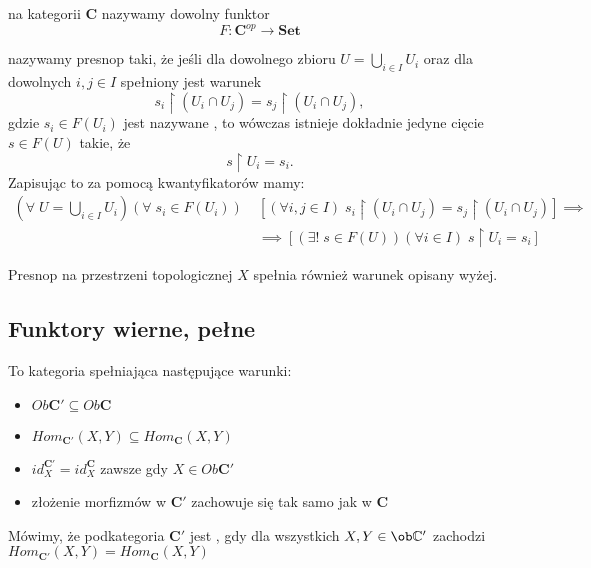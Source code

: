 \begin{definition}
   na kategorii $\mathbf{C}$ nazywamy dowolny funktor
  $$F:\mathbf{C}^{op}\to\mathbf{Set}$$

   nazywamy presnop taki, że jeśli dla dowolnego zbioru $U=\bigcup_{i\in I}U_i$ oraz dla dowolnych $i,j\in I$ spełniony jest warunek
  $$s_i\restriction(U_i\cap U_j)=s_j\restriction(U_i\cap U_j),$$
  gdzie $s_i\in F(U_i)$ jest nazywane , to wówczas istnieje dokładnie jedyne cięcie $s\in F(U)$ takie, że
  $$s\restriction U_i=s_i.$$
  Zapisując to za pomocą kwantyfikatorów mamy:
  \begin{align*}
    (\forall\;U=\bigcup_{i\in I}U_i)
    (\forall\;s_i\in F(U_i))\;
    &\left[ 
      (\forall i,j\in I)\;
      s_i\restriction(U_i\cap U_j)=s_j\restriction(U_i\cap U_j) 
    \right]
    \implies\\
    &\implies\left[
      (\exists!\;s\in F(U))
      (\forall i\in I)\;s\restriction U_i=s_i
    \right]
  \end{align*}
\end{definition}

\begin{example}
  \item Presnop na przestrzeni topologicznej $X$ spełnia również warunek opisany wyżej.
\end{example}

\subsection{Funktory wierne, pełne}

\begin{definition}
  To kategoria spełniająca następujące warunki:
  \begin{itemize}
    \item $Ob\mathbf{C}'\subseteq Ob\mathbf{C}$
    \item $Hom_{\mathbf{C}'}(X,Y)\subseteq Hom_{\mathbf{C}}(X, Y)$
    \item $id_X^{\mathbf{C}'}=id_X^{\mathbf{C}}$ zawsze gdy $X\in Ob\mathbf{C}'$
    \item złożenie morfizmów w $\mathbf{C}'$ zachowuje się tak samo jak w $\mathbf{C}$
  \end{itemize}

  Mówimy, że podkategoria $\mathbf{C}'$ jest , gdy dla wszystkich $X,Y\in\ob\mathbb{C}'$ zachodzi $Hom_{\mathbf{C}'}(X,Y)=Hom_{\mathbf{C}}(X,Y)$
\end{definition}


